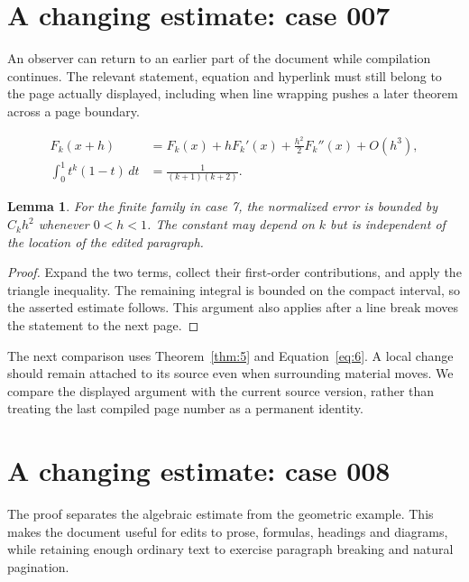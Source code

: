 \documentclass[a4paper,10pt]{article}
\newtheorem{lemma}[theorem]{Lemma}
\begin{document}
\lipsum[3]

\section{A changing estimate: case 007}\label{unit:6}
An observer can return to an earlier part of the document while compilation continues. The relevant statement, equation and hyperlink must still belong to the page actually displayed, including when line wrapping pushes a later theorem across a page boundary.

\lipsum[19-20]
\begin{align}\label{eq:6}
 F_k(x+h)&=F_k(x)+hF_k'(x)+\frac{h^2}{2}F_k''(x)+O(h^3),\\
 \int_0^1 t^k(1-t)\,dt&=\frac{1}{(k+1)(k+2)}.
\end{align}
\begin{lemma}\label{thm:6}
For the finite family in case 7, the normalized error is bounded by $C_k h^2$ whenever $0<h<1$. The constant may depend on $k$ but is independent of the location of the edited paragraph.
\end{lemma}
\begin{proof}
Expand the two terms, collect their first-order contributions, and apply the
triangle inequality. The remaining integral is bounded on the compact interval,
so the asserted estimate follows. This argument also applies after a line break
moves the statement to the next page.
\end{proof}
The next comparison uses Theorem~\ref{thm:5} and Equation~\ref{eq:6}. A local change should remain attached to its source even when surrounding material moves. We compare the displayed argument with the current source version, rather than treating the last compiled page number as a permanent identity.

\lipsum[8]

\section{A changing estimate: case 008}\label{unit:7}
The proof separates the algebraic estimate from the geometric example. This makes the document useful for edits to prose, formulas, headings and diagrams, while retaining enough ordinary text to exercise paragraph breaking and natural pagination.
\end{document}
